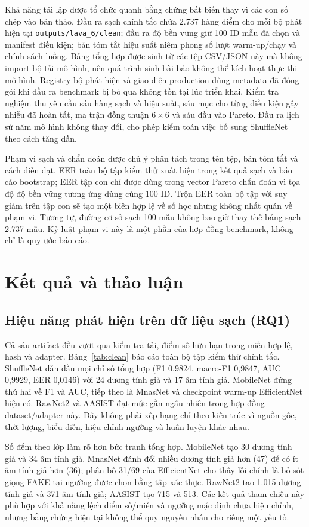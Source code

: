 \documentclass[10pt,journal,onecolumn,a4paper]{IEEEtran}
\begin{document}
Khả năng tái lập được tổ chức quanh bằng chứng bất biến thay vì các con số chép vào bản thảo. Đầu ra sạch chính tắc chứa 2.737 hàng điểm cho mỗi bộ phát hiện tại \texttt{outputs/lava\_6/clean}; đầu ra độ bền vững giữ 100 ID mẫu đã chọn và manifest điều kiện; bản tóm tắt hiệu suất niêm phong số lượt warm-up/chạy và chính sách luồng. Bảng tổng hợp được sinh từ các tệp CSV/JSON này mà không import bộ tải mô hình, nên quá trình sinh bài báo không thể kích hoạt thực thi mô hình. Registry bộ phát hiện và giao diện production dùng metadata đã đóng gói khi đầu ra benchmark bị bỏ qua không tồn tại lúc triển khai. Kiểm tra nghiệm thu yêu cầu sáu hàng sạch và hiệu suất, sáu mục cho từng điều kiện gây nhiễu đã hoàn tất, ma trận đồng thuận $6\times6$ và sáu đầu vào Pareto. Đầu ra lịch sử năm mô hình không thay đổi, cho phép kiểm toán việc bổ sung ShuffleNet theo cách tăng dần.

Phạm vi sạch và chẩn đoán được chủ ý phân tách trong tên tệp, bản tóm tắt và cách diễn đạt. EER toàn bộ tập kiểm thử xuất hiện trong kết quả sạch và báo cáo bootstrap; EER tập con chỉ được dùng trong vector Pareto chẩn đoán vì tọa độ độ bền vững tương ứng dùng cùng 100 ID. Trộn EER toàn bộ tập với suy giảm trên tập con sẽ tạo một biên hợp lệ về số học nhưng không nhất quán về phạm vi. Tương tự, đường cơ sở sạch 100 mẫu không bao giờ thay thế bảng sạch 2.737 mẫu. Kỷ luật phạm vi này là một phần của hợp đồng benchmark, không chỉ là quy ước báo cáo.

\section{Kết quả và thảo luận}
\subsection{Hiệu năng phát hiện trên dữ liệu sạch (RQ1)}
Cả sáu artifact đều vượt qua kiểm tra tải, điểm số hữu hạn trong miền hợp lệ, hash và adapter. Bảng~\ref{tab:clean} báo cáo toàn bộ tập kiểm thử chính tắc. ShuffleNet dẫn đầu mọi chỉ số tổng hợp (F1 0,9824, macro-F1 0,9847, AUC 0,9929, EER 0,0146) với 24 dương tính giả và 17 âm tính giả. MobileNet đứng thứ hai về F1 và AUC, tiếp theo là MnasNet và checkpoint warm-up EfficientNet hiện có. RawNet2 và AASIST đạt mức gần ngẫu nhiên trong hợp đồng dataset/adapter này. Đây không phải xếp hạng chỉ theo kiến trúc vì nguồn gốc, thời lượng, biểu diễn, hiệu chỉnh ngưỡng và huấn luyện khác nhau.

Số đếm theo lớp làm rõ hơn bức tranh tổng hợp. MobileNet tạo 30 dương tính giả và 34 âm tính giả. MnasNet đánh đổi nhiều dương tính giả hơn (47) để có ít âm tính giả hơn (36); phân bố 31/69 của EfficientNet cho thấy lỗi chính là bỏ sót giọng FAKE tại ngưỡng được chọn bằng tập xác thực. RawNet2 tạo 1.015 dương tính giả và 371 âm tính giả; AASIST tạo 715 và 513. Các kết quả tham chiếu này phù hợp với khả năng lệch điểm số/miền và ngưỡng mặc định chưa hiệu chỉnh, nhưng bằng chứng hiện tại không thể quy nguyên nhân cho riêng một yếu tố.
\end{document}
